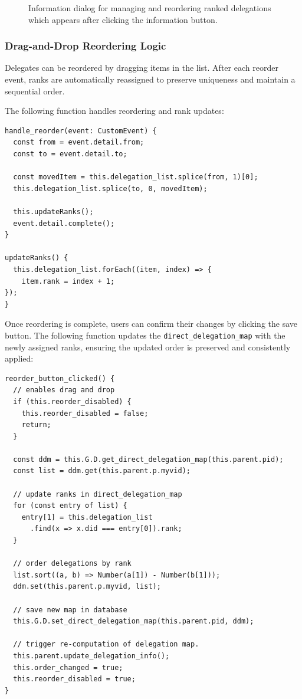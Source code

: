 \begin{figure}[H]
  \caption{Information dialog for managing and reordering ranked delegations which appears after clicking the information button.}
\end{figure}

\subsubsection{Drag-and-Drop Reordering Logic}

Delegates can be reordered by dragging items in the list. After each reorder event, ranks are automatically reassigned to preserve uniqueness and maintain a sequential order.

The following  function handles reordering and rank updates:

\begin{verbatim}
handle_reorder(event: CustomEvent) {
  const from = event.detail.from;
  const to = event.detail.to;

  const movedItem = this.delegation_list.splice(from, 1)[0];
  this.delegation_list.splice(to, 0, movedItem);

  this.updateRanks();
  event.detail.complete();
}

updateRanks() {
  this.delegation_list.forEach((item, index) => {
    item.rank = index + 1;
});
}
\end{verbatim}

Once reordering is complete, users can confirm their changes by clicking the save button. The following function updates the \texttt{direct\_delegation\_map} with the newly assigned ranks, ensuring the updated order is preserved and consistently applied:

\begin{verbatim}
reorder_button_clicked() {
  // enables drag and drop
  if (this.reorder_disabled) {
    this.reorder_disabled = false;
    return;
  }

  const ddm = this.G.D.get_direct_delegation_map(this.parent.pid);
  const list = ddm.get(this.parent.p.myvid);

  // update ranks in direct_delegation_map
  for (const entry of list) {
    entry[1] = this.delegation_list
      .find(x => x.did === entry[0]).rank;
  }

  // order delegations by rank
  list.sort((a, b) => Number(a[1]) - Number(b[1]));
  ddm.set(this.parent.p.myvid, list);

  // save new map in database
  this.G.D.set_direct_delegation_map(this.parent.pid, ddm);

  // trigger re-computation of delegation map.
  this.parent.update_delegation_info();
  this.order_changed = true;
  this.reorder_disabled = true;
}
\end{verbatim}

